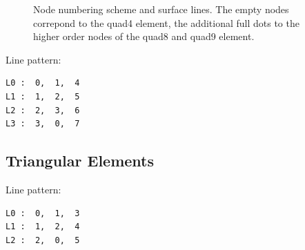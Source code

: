 \begin{figure}[h!]
\begin{center}
\caption{Node numbering scheme and surface lines. The empty nodes correpond to the quad4 element, the additional full dots to the higher order nodes of the quad8 and quad9 element.}
\label{fig:conventions:2d}
\end{center}
\end{figure}

Line pattern:
\begin{verbatim}
L0 :  0,  1,  4
L1 :  1,  2,  5
L2 :  2,  3,  6
L3 :  3,  0,  7
\end{verbatim}


\subsection{Triangular Elements}

Line pattern:
\begin{verbatim}
L0 :  0,  1,  3
L1 :  1,  2,  4
L2 :  2,  0,  5
\end{verbatim}





\newpage

